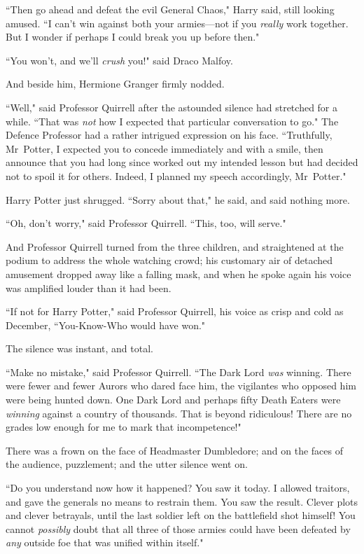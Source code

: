 ``Then go ahead and defeat the evil General Chaos," Harry said, still looking amused. ``I can't win against both your armies—not if you \emph{really} work together. But I wonder if perhaps I could break you up before then."

``You won't, and we'll \emph{crush} you!" said Draco Malfoy.

And beside him, Hermione Granger firmly nodded.

``Well," said Professor Quirrell after the astounded silence had stretched for a while. ``That was \emph{not} how I expected that particular conversation to go." The Defence Professor had a rather intrigued expression on his face. ``Truthfully, Mr~Potter, I expected you to concede immediately and with a smile, then announce that you had long since worked out my intended lesson but had decided not to spoil it for others. Indeed, I planned my speech accordingly, Mr~Potter."

Harry Potter just shrugged. ``Sorry about that," he said, and said nothing more.

``Oh, don't worry," said Professor Quirrell. ``This, too, will serve."

And Professor Quirrell turned from the three children, and straightened at the podium to address the whole watching crowd; his customary air of detached amusement dropped away like a falling mask, and when he spoke again his voice was amplified louder than it had been.

``If not for Harry Potter," said Professor Quirrell, his voice as crisp and cold as December, ``You-Know-Who would have won."

The silence was instant, and total.

\later

``Make no mistake," said Professor Quirrell. ``The Dark Lord \emph{was} winning. There were fewer and fewer Aurors who dared face him, the vigilantes who opposed him were being hunted down. One Dark Lord and perhaps fifty Death Eaters were \emph{winning} against a country of thousands. That is beyond ridiculous! There are no grades low enough for me to mark that incompetence!"

There was a frown on the face of Headmaster Dumbledore; and on the faces of the audience, puzzlement; and the utter silence went on.

``Do you understand now how it happened? You saw it today. I allowed traitors, and gave the generals no means to restrain them. You saw the result. Clever plots and clever betrayals, until the last soldier left on the battlefield shot himself! You cannot \emph{possibly} doubt that all three of those armies could have been defeated by \emph{any} outside foe that was unified within itself."

